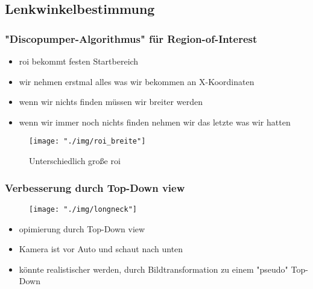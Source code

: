 \documentclass{beamer}
\begin{document}
\subsection{Lenkwinkelbestimmung}
\begin{frame}

\frametitle{"Discopumper-Algorithmus" für Region-of-Interest}

\begin{itemize}
\item roi bekommt festen Startbereich
\item wir nehmen erstmal alles was wir bekommen an X-Koordinaten
\item wenn wir nichts finden müssen wir breiter werden
\item wenn wir immer noch nichts finden nehmen wir das letzte was wir hatten
\end{itemize}

\begin{center}
\begin{figure}[h]
\centering
\texttt{[image: "./img/roi\_breite"]}
\label{fig:roi}
\caption{Unterschiedlich große roi}
\end{figure}
\end{center}


\end{frame}

\begin{frame}
\frametitle{Verbesserung durch Top-Down view}

\begin{center}
\begin{figure}[h]
\centering
\texttt{[image: "./img/longneck"]}
\label{fig:longneck}
\end{figure}
\end{center}

\begin{itemize}
\item opimierung durch Top-Down view
\item Kamera ist vor Auto und schaut nach unten
\item könnte realistischer werden, durch Bildtransformation zu einem "pseudo" Top-Down 
\end{itemize}
\end{frame}
\end{document}
